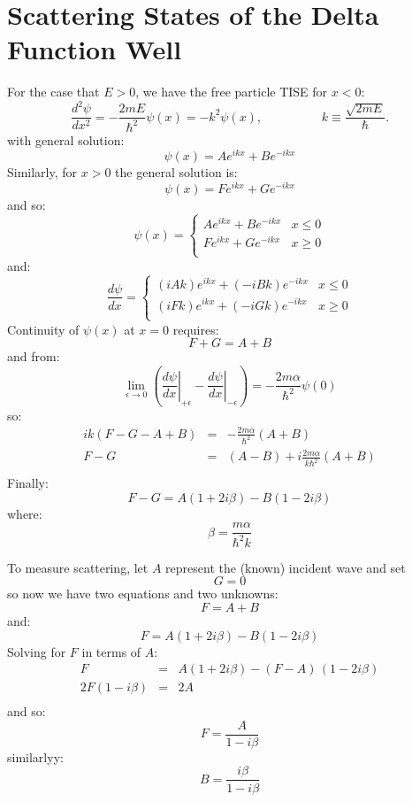 \documentclass[12pt]{book}
\begin{document}
\section{Scattering States of the Delta Function Well}

For the case that $E>0$, we have the free particle TISE for $x<0$:
\begin{equation*}
\frac{d^2 \psi}{d x^2} = -\frac{2mE}{\hbar^2}\psi(x) = -k^2 \psi(x), \hspace{2cm} k \equiv \frac{\sqrt{2mE}}{\hbar}.
\end{equation*}
with general solution:
$$\psi(x) = A e^{\displaystyle ikx} + B e^{\displaystyle -ikx}$$
Similarly, for $x>0$ the general solution is:
$$\psi(x) = F e^{\displaystyle ikx} + G e^{\displaystyle -ikx}$$
and so:
$$\psi(x) = \begin{cases}
A e^{\displaystyle ikx} + B e^{\displaystyle -ikx} &  x\leq0 \\
F e^{\displaystyle ikx} + G e^{\displaystyle -ikx} &  x\geq0 \\
\end{cases}
$$
and:
$$\frac{d\psi}{dx} = \begin{cases}
(iAk) e^{\displaystyle ikx} + (-iBk) e^{\displaystyle -ikx} &  x\leq0 \\
(iFk) e^{\displaystyle ikx} + (-iGk) e^{\displaystyle -ikx} &  x\geq0 \\
\end{cases}
$$
Continuity of $\psi(x)$ at $x=0$ requires:
$$F+G=A+B$$
and from:
$$
\lim_{\epsilon \to 0} \left( \left. \frac{d\psi}{d x} \right\rvert_{+\epsilon} 
- \left. \frac{d\psi}{d x} \right\rvert_{-\epsilon} \right) = 
-\frac{2m\alpha}{\hbar^2} \psi(0) 
$$
so:
\begin{eqnarray*}
ik(F-G-A+B) &=& -\frac{2m\alpha}{\hbar^2} (A+B) \\
F-G &=& (A-B)+i\frac{2m\alpha}{k\hbar^2} (A+B) \\
\end{eqnarray*}
Finally:
$$F-G = A (1+2i\beta) - B (1-2i\beta) $$
where:
$$\beta = \frac{m \alpha}{\hbar^2 k}$$

To measure scattering, let $A$ represent the (known) incident wave and set
$$G=0$$
so now we have two equations and two unknowns:
$$F = A + B$$
and:
$$F = A (1+2i\beta) - B (1-2i\beta) $$
Solving for $F$ in terms of $A$:
\begin{eqnarray*}
F &=& A (1+2i\beta) - (F-A)\,(1-2i\beta)\\
2F(1-i\beta) &=& 2A \\
\end{eqnarray*}
and so:
$$F = \frac{A}{1-i\beta}$$
similarlyy:
$$B = \frac{i\beta}{1-i\beta}$$
\end{document}
